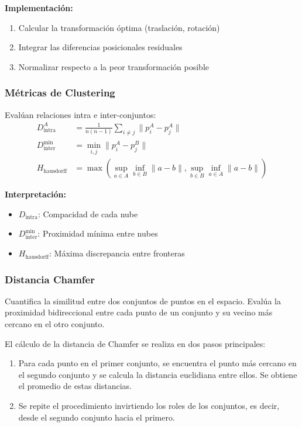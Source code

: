 \textbf{Implementación:}
\begin{enumerate}
    \item Calcular la transformación óptima (traslación, rotación)
    \item Integrar las diferencias posicionales residuales
    \item Normalizar respecto a la peor transformación posible
\end{enumerate}


\subsubsection{Métricas de Clustering}
\label{subsec:cluster-metrics}
Evalúan relaciones intra e inter-conjuntos:
\begin{align}
D_{\text{intra}}^A &= \frac{1}{n(n-1)} \sum_{i \neq j} \|p_i^A - p_j^A\| \\
D_{\text{inter}}^{\min} &= \min_{i,j} \|p_i^A - p_j^B\| \\
H_{\text{hausdorff}} &= \max\left( \sup_{a \in A} \inf_{b \in B} \|a-b\|, \sup_{b \in B} \inf_{a \in A} \|a-b\| \right)
\end{align}

\textbf{Interpretación:}
\begin{itemize}
    \item $D_{\text{intra}}$: Compacidad de cada nube
    \item $D_{\text{inter}}^{\min}$: Proximidad mínima entre nubes
    \item $H_{\text{hausdorff}}$: Máxima discrepancia entre fronteras
\end{itemize}

\subsubsection{Distancia Chamfer}
Cuantifica la similitud entre dos conjuntos de puntos en el espacio. Evalúa la proximidad bidireccional entre cada punto de un conjunto y su vecino más cercano en el otro conjunto.

El cálculo de la distancia de Chamfer se realiza en dos pasos principales:

\begin{enumerate}
    \item Para cada punto en el primer conjunto, se encuentra el punto más cercano en el segundo conjunto y se calcula la distancia euclidiana entre ellos. Se obtiene el promedio de estas distancias.
    \item Se repite el procedimiento invirtiendo los roles de los conjuntos, es decir, desde el segundo conjunto hacia el primero.
\end{enumerate}

